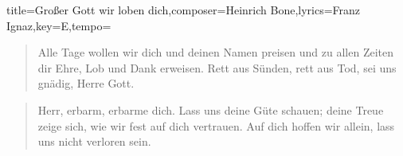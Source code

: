 \documentclass{leadsheet}
\begin{document}
\begin{song}{title={Großer Gott wir loben dich},composer={Heinrich Bone},lyrics={Franz Ignaz},key={E},tempo={}}
\begin{verse}
Alle Tage wollen wir dich und deinen Namen preisen
und zu allen Zeiten dir Ehre, Lob und Dank erweisen.
Rett aus Sünden, rett aus Tod, sei uns gnädig, Herre Gott.
\end{verse}

\begin{verse}
Herr, erbarm, erbarme dich. Lass uns deine Güte schauen;
deine Treue zeige sich, wie wir fest auf dich vertrauen.
Auf dich hoffen wir allein, lass uns nicht verloren sein.
\end{verse}

\end{song}
\end{document}

